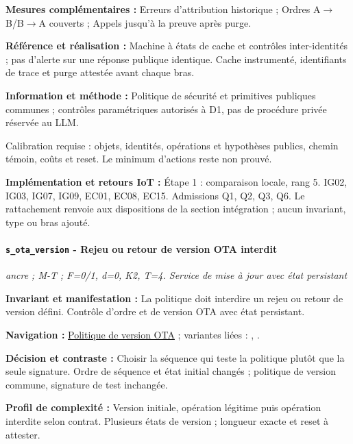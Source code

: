 \documentclass[11pt,a4paper]{article}
\newcommand{\code}[1]{{\small\ttfamily\path{#1}}}
\newcommand{\scenariolink}[1]{\hyperref[scenario:#1]{\code{#1}}}
\newcommand{\comparisonlink}[2]{\hyperlink{comparison:#1}{#2}}
\begin{document}
\textbf{Mesures complémentaires :} Erreurs d’attribution historique ; Ordres A$\rightarrow$B/B$\rightarrow$A couverts ; Appels jusqu’à la preuve après purge.

\textbf{Référence et réalisation :} Machine à états de cache et contrôles inter-identités ; pas d’alerte sur une réponse publique identique. Cache instrumenté, identifiants de trace et purge attestée avant chaque bras.

\textbf{Information et méthode :} Politique de sécurité et primitives publiques communes ; contrôles paramétriques autorisés à D1, pas de procédure privée réservée au LLM.

Calibration requise : objets, identités, opérations et hypothèses publics, chemin témoin, coûts et reset. Le minimum d’actions reste non prouvé.

\textbf{Implémentation et retours IoT :} Étape 1 : comparaison locale, rang 5. IG02, IG03, IG07, IG09, EC01, EC08, EC15. Admissions Q1, Q2, Q3, Q6. Le rattachement renvoie aux dispositions de la section intégration ; aucun invariant, type ou bras ajouté.

\par\noindent\begin{minipage}{\linewidth}\setlength{\parskip}{5pt}\paragraph{\texttt{s\_ota\_version} - Rejeu ou retour de version OTA interdit}\label{scenario:s_ota_version}
\textit{ancre ; M-T ; F=0/1, d=0, K2, T=4. Service de mise à jour avec état persistant}

\textbf{Invariant et manifestation :} La politique doit interdire un rejeu ou retour de version défini. Contrôle d’ordre et de version OTA avec état persistant.\par\end{minipage}\par


\textbf{Navigation :} \comparisonlink{E06}{Politique de version OTA} ; variantes liées : \scenariolink{s_ota_preuves}, \scenariolink{s_ota_contrat}.

\textbf{Décision et contraste :} Choisir la séquence qui teste la politique plutôt que la seule signature. Ordre de séquence et état initial changés ; politique de version commune, signature de test inchangée.

\textbf{Profil de complexité :} Version initiale, opération légitime puis opération interdite selon contrat. Plusieurs états de version ; longueur exacte et reset à attester.
\end{document}
